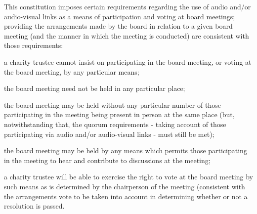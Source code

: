 ﻿\documentclass[a4paper,11pt,onecolumn ]{article}
\begin{document}
\begin{legal}
\item This constitution imposes certain requirements regarding the use of audio and/or audio-visual links as a means of participation and voting at board meetings; providing the arrangements made by the board in relation to a given board meeting (and the manner in which the meeting is conducted) are consistent with those requirements: 
    \begin{legal}[label=\alph*)]
    \item a charity trustee cannot insist on participating in the board meeting, or voting at the board meeting, by any particular means; 
    \item the board meeting need not be held in any particular place; 
    \item the board meeting may be held without any particular number of those participating in the meeting being present in person at the same place (but, notwithstanding that, the quorum requirements - taking account of those participating via audio and/or audio-visual links - must still be met); 
    \item the board meeting may be held by any means which permits those participating in the meeting to hear and contribute to discussions at the meeting; 
    \item a charity trustee will be able to exercise the right to vote at the board meeting by such means as is determined by the chairperson of the meeting (consistent with the arrangements vote to be taken into account in determining whether or not a resolution is passed.
    \end{legal}
\end{legal}
\end{document}
